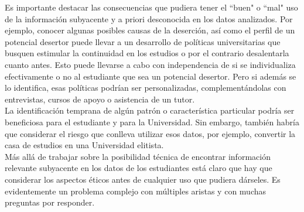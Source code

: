 


Es importante destacar las consecuencias que pudiera tener el ``buen" o ``mal" uso de la información subyacente y a priori desconocida en los datos analizados. Por ejemplo, conocer algunas posibles causas de la deserción, así como el perfil de un potencial desertor puede llevar a un desarrollo de políticas universitarias
que busquen estimular la continuidad en los estudios o por el contrario desalentarla
cuanto antes. Esto puede llevarse a cabo con independencia de si se individualiza
efectivamente o no al estudiante que sea un potencial desertor. Pero si además se lo
identifica, esas políticas podrían ser personalizadas, complementándolas con
entrevistas, cursos de apoyo o asistencia de un tutor. \\
La identificación temprana de algún patrón o característica particular podría ser beneficiosa para el estudiante y para la Universidad. Sin embargo, también habría que considerar el riesgo que conlleva utilizar esos datos, por ejemplo, convertir la casa de estudios en una Universidad elitista.\\
Más allá de trabajar sobre la posibilidad técnica de encontrar información relevante
subyacente en los datos de los estudiantes está claro que hay que considerar los
aspectos éticos antes de cualquier uso que pudiera dárseles. Es evidentemente un
problema complejo con múltiples aristas y con muchas preguntas por responder.

